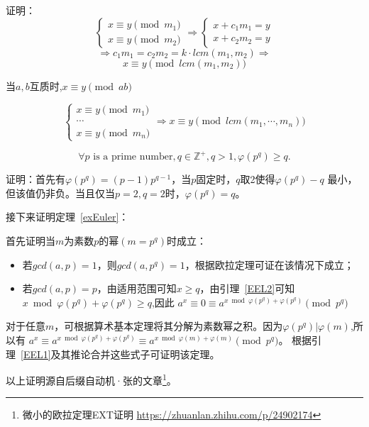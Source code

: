 证明：
\begin{displaymath}
	\left\{
	\begin{array}{l}
		x\equiv y \pmod{m_1} \\
		x\equiv y \pmod{m_2}
	\end{array}
	\right.
	\Rightarrow
	\left\{
	\begin{array}{l}
		x+c_1m_1=y \\
		x+c_2m_2=y
	\end{array}
	\right.
\end{displaymath}
\begin{displaymath}
	\Rightarrow
	c_1m_1=c_2m_2=k\cdot lcm(m_1,m_2)
	\Rightarrow
\end{displaymath}
\begin{displaymath}
	x \equiv y \pmod{lcm(m_1,m_2)}
\end{displaymath}

\begin{inference}\label{EEL1I}
	当$a,b$互质时,$x\equiv y \pmod{ab}$
\end{inference}

\begin{inference}
	\begin{displaymath}
		\left\{
		\begin{array}{l}
			x\equiv y \pmod{m_1} \\
			\cdots               \\
			x\equiv y \pmod{m_n}
		\end{array}
		\right.
		\Rightarrow x\equiv y \pmod{lcm(m_1,\cdots,m_n)}
	\end{displaymath}
\end{inference}

\begin{lemma}\label{EEL2}
	\begin{displaymath}
		\forall p\textrm{ is a prime number},q\in \mathbb{Z^+},q>1,
		\varphi(p^q)\geq q.
	\end{displaymath}
\end{lemma}

证明：首先有$\varphi(p^q)=(p-1)p^{q-1}$，当$p$固定时，$q$取2使得$\varphi(p^q)-q$
最小，但该值仍非负。当且仅当$p=2,q=2$时，$\varphi(p^q)=q$。

接下来证明定理~\ref{exEuler}：

首先证明当$m$为素数$p$的幂$(m=p^q)$时成立：
\begin{itemize}
	\item 若$gcd(a,p)=1$，则$gcd(a,p^q)=1$，根据欧拉定理可证在该情况下成立；
	\item 若$gcd(a,p)=p$，由适用范围可知$x\geq q$，由引理~\ref{EEL2}可知
	      $x \bmod \varphi(p^q) + \varphi(p^q) \geq q$,因此
	      $a^x\equiv 0 \equiv a^{x \bmod \varphi(p^q)+\varphi(p^q)} \pmod{p^q}$
\end{itemize}

对于任意$m$，可根据算术基本定理将其分解为素数幂之积。因为$\varphi(p^q)|\varphi(m)$,所以有
$a^x\equiv a^{x \bmod \varphi(p^q)+\varphi(p^q)}
	\equiv a^{x \bmod \varphi(m)+\varphi(m)} \pmod{p^q}$。
根据引理~\ref{EEL1}及其推论合并这些式子可证明该定理。

以上证明源自后缀自动机·张的文章\footnote{微小的欧拉定理EXT证明
	\url{https://zhuanlan.zhihu.com/p/24902174}}。
